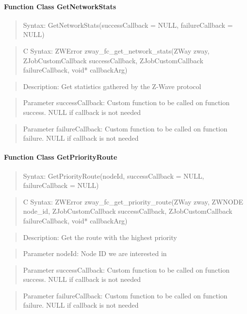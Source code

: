 \paragraph{Function Class GetNetworkStats}
\begin{quote}Syntax: GetNetworkStats(successCallback = NULL, failureCallback = NULL)\end{quote}
\begin{quote}C Syntax: ZWError zway\_fc\_get\_network\_stats(ZWay zway, ZJobCustomCallback successCallback, ZJobCustomCallback failureCallback, void* callbackArg)\end{quote}
\begin{quote}Description: Get statistics gathered by the Z-Wave protocol\end{quote}
\begin{quote}Parameter successCallback: Custom function to be called on function success. NULL if callback is not needed\end{quote}
\begin{quote}Parameter failureCallback: Custom function to be called on function failure. NULL if callback is not needed\end{quote}


\paragraph{Function Class GetPriorityRoute}
\begin{quote}Syntax: GetPriorityRoute(nodeId, successCallback = NULL, failureCallback = NULL)\end{quote}
\begin{quote}C Syntax: ZWError zway\_fc\_get\_priority\_route(ZWay zway, ZWNODE node\_id, ZJobCustomCallback successCallback, ZJobCustomCallback failureCallback, void* callbackArg)\end{quote}
\begin{quote}Description: Get the route with the highest priority\end{quote}
\begin{quote}Parameter nodeId: Node ID we are interested in\end{quote}
\begin{quote}Parameter successCallback: Custom function to be called on function success. NULL if callback is not needed\end{quote}
\begin{quote}Parameter failureCallback: Custom function to be called on function failure. NULL if callback is not needed\end{quote}


